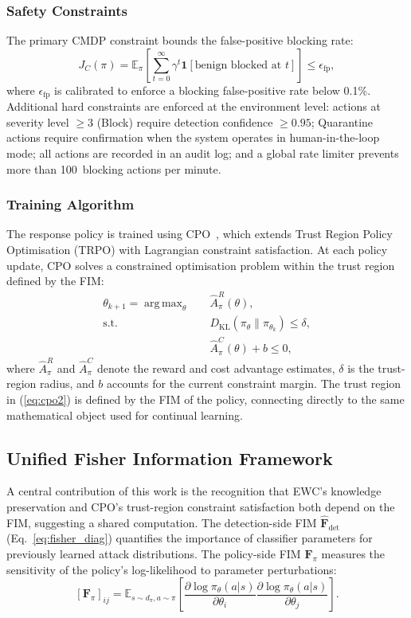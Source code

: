 \documentclass[journal]{IEEEtran}
\theoremstyle{definition}
\theoremstyle{remark}
\newcommand{\FIM}{\mathbf{F}}
\newcommand{\expect}{\mathbb{E}}
\DeclareMathOperator*{\argmax}{arg\,max}
\begin{document}
\subsubsection{Safety Constraints}
The primary CMDP constraint bounds the false-positive blocking rate:
\begin{equation}
\label{eq:fp_constraint}
J_C(\pi) = \expect_\pi\!\left[\sum_{t=0}^{\infty}\gamma^t \mathbf{1}[\text{benign blocked at }t]\right] \leq \epsilon_{\mathrm{fp}},
\end{equation}
where $\epsilon_{\mathrm{fp}}$ is calibrated to enforce a blocking false-positive rate below 0.1\%. Additional hard constraints are enforced at the environment level: actions at severity level $\geq 3$ (Block) require detection confidence $\geq 0.95$; Quarantine actions require confirmation when the system operates in human-in-the-loop mode; all actions are recorded in an audit log; and a global rate limiter prevents more than 100~blocking actions per minute.

\subsubsection{Training Algorithm}
The response policy is trained using CPO~\cite{achiam2017cpo}, which extends Trust Region Policy Optimisation (TRPO) with Lagrangian constraint satisfaction. At each policy update, CPO solves a constrained optimisation problem within the trust region defined by the FIM:
\begin{align}
\theta_{k+1} = \argmax_\theta \quad & \hat{A}^R_\pi(\theta), \label{eq:cpo1}\\
\text{s.t.} \quad & D_{\mathrm{KL}}(\pi_\theta \| \pi_{\theta_k}) \leq \delta, \label{eq:cpo2}\\
& \hat{A}^C_\pi(\theta) + b \leq 0, \label{eq:cpo3}
\end{align}
where $\hat{A}^R_\pi$ and $\hat{A}^C_\pi$ denote the reward and cost advantage estimates, $\delta$ is the trust-region radius, and $b$ accounts for the current constraint margin. The trust region in (\ref{eq:cpo2}) is defined by the FIM of the policy, connecting directly to the same mathematical object used for continual learning.

\subsection{Unified Fisher Information Framework}
\label{subsec:unified_fim}

A central contribution of this work is the recognition that EWC's knowledge preservation and CPO's trust-region constraint satisfaction both depend on the FIM, suggesting a shared computation. The detection-side FIM $\hat{\FIM}_{\mathrm{det}}$ (Eq.~\ref{eq:fisher_diag}) quantifies the importance of classifier parameters for previously learned attack distributions. The policy-side FIM $\FIM_\pi$ measures the sensitivity of the policy's log-likelihood to parameter perturbations:
\begin{equation}
\label{eq:policy_fim}
[\FIM_\pi]_{ij} = \expect_{s\sim d_\pi, a\sim\pi}\!\left[\frac{\partial\log\pi_\theta(a|s)}{\partial\theta_i}\frac{\partial\log\pi_\theta(a|s)}{\partial\theta_j}\right].
\end{equation}
\end{document}
